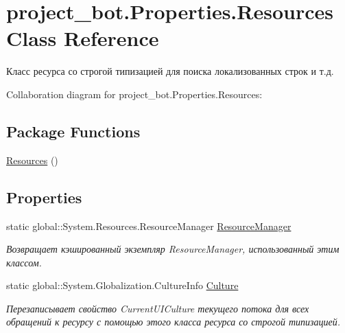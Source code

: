 \hypertarget{classproject__bot_1_1_properties_1_1_resources}{}\section{project\+\_\+bot.\+Properties.\+Resources Class Reference}
\label{classproject__bot_1_1_properties_1_1_resources}


Класс ресурса со строгой типизацией для поиска локализованных строк и т.\+д.  




Collaboration diagram for project\+\_\+bot.\+Properties.\+Resources\+:
\subsection*{Package Functions}
\begin{DoxyCompactItemize}
\item 
\hyperlink{classproject__bot_1_1_properties_1_1_resources_a89706512e3081d1777e26ecd9b57bdf5}{Resources} ()
\end{DoxyCompactItemize}
\subsection*{Properties}
\begin{DoxyCompactItemize}
\item 
static global\+::\+System.\+Resources.\+Resource\+Manager \hyperlink{classproject__bot_1_1_properties_1_1_resources_a3f054d54e95800568ebf58498aa2fe67}{Resource\+Manager}
\begin{DoxyCompactList}\small\item\em Возвращает кэшированный экземпляр Resource\+Manager, использованный этим классом. \end{DoxyCompactList}\item 
static global\+::\+System.\+Globalization.\+Culture\+Info \hyperlink{classproject__bot_1_1_properties_1_1_resources_ad774160d8b01c24fdc2e7ace1d23d648}{Culture}
\begin{DoxyCompactList}\small\item\em Перезаписывает свойство Current\+U\+I\+Culture текущего потока для всех обращений к ресурсу с помощью этого класса ресурса со строгой типизацией. \end{DoxyCompactList}\end{DoxyCompactItemize}
